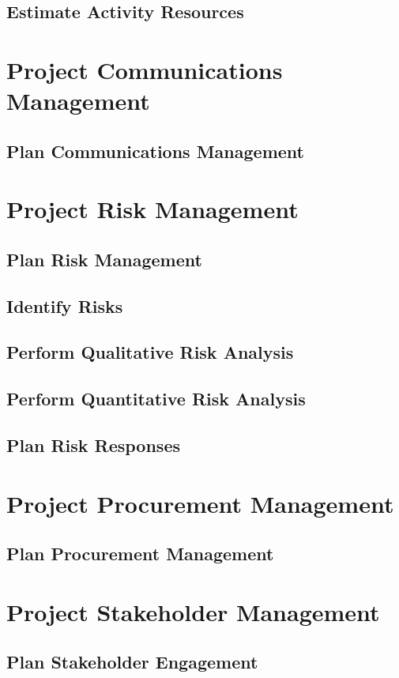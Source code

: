 \documentclass[12pt,letterpaper]{report}
\begin{document}
	\section{Estimate Activity Resources}
	\chapter{Project Communications Management}
	\section{Plan Communications Management}
	\chapter{Project Risk Management}
	\section{Plan Risk Management}
	\section{Identify Risks}
	\section{Perform Qualitative Risk Analysis}
	\section{Perform Quantitative Risk Analysis}
	\section{Plan Risk Responses}
	\chapter{Project Procurement Management}
	\section{Plan Procurement Management}
	\chapter{Project Stakeholder Management}
	\section{Plan Stakeholder Engagement}
	
\end{document}

